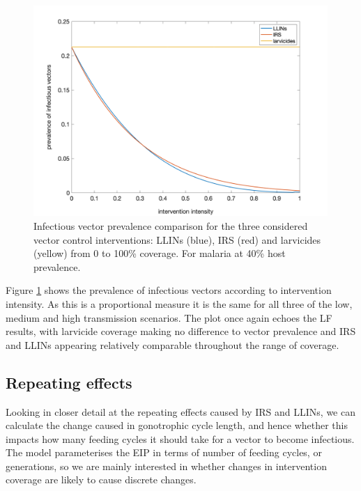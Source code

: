 \begin{figure}[h]
\begin{center}
\includegraphics[height=8cm]{Project/Figures/VectorModel/Malaria/VecPrev_lowmidhigh_new.png}
\caption{Infectious vector prevalence comparison for the three considered vector control interventions: LLINs (blue), IRS (red) and larvicides (yellow) from 0 to 100\% coverage. For malaria at 40\% host prevalence.}
\label{fig:VecPrev_Ma}
\end{center}
\end{figure}

Figure \ref{fig:VecPrev_Ma} shows the prevalence of infectious vectors according to intervention intensity. As this is a proportional measure it is the same for all three of the low, medium and high transmission scenarios. The plot once again echoes the LF results, with larvicide coverage making no difference to vector prevalence and IRS and LLINs appearing relatively comparable throughout the range of coverage.

\subsection{Repeating effects}

Looking in closer detail at the repeating effects caused by IRS and LLINs, we can calculate the change caused in gonotrophic cycle length, and hence whether this impacts how many feeding cycles it should take for a vector to become infectious. The model parameterises the EIP in terms of number of feeding cycles, or generations, so we are mainly interested in whether changes in intervention coverage are likely to cause discrete changes.

